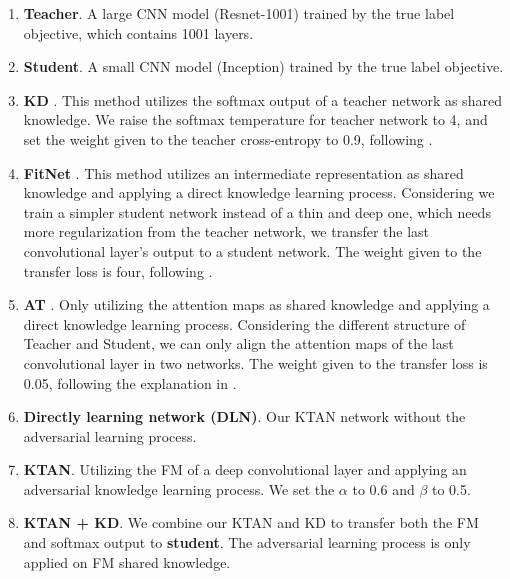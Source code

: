 \documentclass[letterpaper]{article} %
\begin{document}
\begin{enumerate}[(1)]
	\item \textbf{Teacher}. A large CNN model (Resnet-1001) trained by the true label objective, which contains 1001 layers.
	\item \textbf{Student}. A small CNN model (Inception) trained by the true label objective.
	\item \textbf{KD} \cite{hinton2015distilling}. This method utilizes the softmax output of a teacher network as shared knowledge. We raise the softmax temperature for teacher network to 4, and set the weight given to the teacher cross-entropy to 0.9, following \cite{hinton2015distilling}.
	\item \textbf{FitNet} \cite{romero2014fitnets}. This method utilizes an intermediate representation as shared knowledge and applying a direct knowledge learning process. Considering we train a simpler student network instead of a thin and deep one, which needs more regularization from the teacher network, we transfer the last convolutional layer's output to a student network. The weight given to the transfer loss is four, following \cite{romero2014fitnets}.
	\item \textbf{AT} \cite{zagoruyko2016paying}. Only utilizing the attention maps as shared knowledge and applying a direct knowledge learning process. Considering the different structure of Teacher and Student, we can only align the attention maps of the last convolutional layer in two networks. The weight given to the transfer loss is 0.05, following the explanation in \cite{zagoruyko2016paying}.
	\item \textbf{Directly learning network (DLN)}. Our KTAN network without the adversarial learning process.
	\item 	\textbf{KTAN}. Utilizing the FM of a deep convolutional layer and applying an adversarial knowledge learning process. We set the $\alpha$ to 0.6 and $\beta$ to 0.5.
	\item \textbf{KTAN + KD}. We combine our KTAN and KD to transfer both the FM and softmax output to \textbf{student}. The adversarial learning process is only applied on FM shared knowledge.
\end{enumerate}
\end{document}
